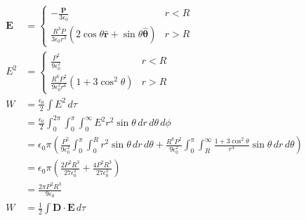 \documentclass{article}
\renewcommand{\vec}[1]{\boldsymbol{\mathbf{#1}}}
\newcommand{\uvec}[1]{\hat{\vec{#1}}}
\begin{document}
\subsection{}

\begin{align*}
  \vec{E} & = \begin{cases}
                -\frac{\vec{P}}{3 \epsilon_0}                                                       & r < R \\
                \frac{R^3 P}{3 \epsilon_0 r^3} (2 \cos \theta \uvec{r} + \sin \theta \uvec{\theta}) & r > R
              \end{cases}                                                                                                                          \\
  E^2     & = \begin{cases}
                \frac{P^2}{9 \epsilon_0^2}                               & r < R \\
                \frac{R^6 P^2}{9 \epsilon_0^2 r^6} (1 + 3 \cos^2 \theta) & r > R
              \end{cases}                                                                                                                                                                     \\
  W       & = \frac{\epsilon_0}{2} \int E^2 \,d \tau                                                                                                                                                                                               \\
          & = \frac{\epsilon_0}{2} \int_0^{2 \pi} \int_0^\pi \int_0^\infty E^2 r^2 \sin \theta \,d r \,d \theta \,d \phi                                                                                                                           \\
          & = \epsilon_0 \pi \left( \frac{P^2}{9 \epsilon_0^2} \int_0^\pi \int_0^R r^2 \sin \theta \,d r \,d \theta + \frac{R^6 P^2}{9 \epsilon_0^2} \int_0^\pi \int_R^\infty \frac{1 + 3 \cos^2 \theta}{r^4} \sin \theta \,d r \,d \theta \right) \\
          & = \epsilon_0 \pi \left( \frac{2 P^2 R^3}{27 \epsilon_0^2} + \frac{4 P^2 R^3}{27 \epsilon_0^2} \right)                                                                                                                                  \\
          & = \frac{2 \pi P^2 R^3}{9 \epsilon_0}                                                                                                                                                                                                   \\
  W       & = \frac{1}{2} \int \vec{D} \cdot \vec{E} \,d \tau
\end{align*}
\end{document}
